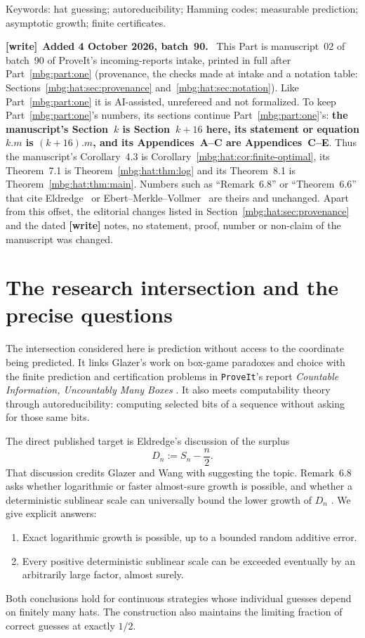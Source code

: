 \documentclass[11pt,letterpaper]{article}
\theoremstyle{definition}
\newcommand{\repo}{\texttt{ProveIt}}
\newenvironment{writenote}[1][]{\par\smallskip\begingroup\small
 \noindent\textbf{[write]}\if\relax\detokenize{#1}\relax\else~\textbf{#1.}\fi\ }%
 {\par\endgroup\smallskip}
\begin{document}
{\small\color{muted}Keywords: hat guessing; autoreducibility; Hamming codes;
measurable prediction; asymptotic growth; finite certificates.\par}

\begin{writenote}[Added 4 October 2026, batch~90]
This Part is manuscript~02 of batch~90 of ProveIt's incoming-reports intake, printed in full after Part~\ref{mbg:part:one} (provenance, the checks made at intake and a notation table: Sections~\ref{mbg:hat:sec:provenance} and~\ref{mbg:hat:sec:notation}). Like Part~\ref{mbg:part:one} it is AI-assisted, unrefereed and not formalized. To keep Part~\ref{mbg:part:one}'s numbers, its sections continue Part~\ref{mbg:part:one}'s: \textbf{the manuscript's Section~$k$ is Section~$k+16$ here, its statement or equation $k.m$ is $(k+16).m$, and its Appendices~A--C are Appendices~C--E}. Thus the manuscript's Corollary~4.3 is Corollary~\ref{mbg:hat:cor:finite-optimal}, its Theorem~7.1 is Theorem~\ref{mbg:hat:thm:log} and its Theorem~8.1 is Theorem~\ref{mbg:hat:thm:main}. Numbers such as ``Remark~6.8'' or ``Theorem~6.6'' that cite Eldredge~\cite{hat:Eldredge} or Ebert--Merkle--Vollmer~\cite{hat:EMV} are theirs and unchanged. Apart from this offset, the editorial changes listed in Section~\ref{mbg:hat:sec:provenance} and the dated \textbf{[write]} notes, no statement, proof, number or non-claim of the manuscript was changed.
\end{writenote}

\section{The research intersection and the precise questions}
\label{mbg:hat:sec:introduction}

The intersection considered here is prediction without access to the
coordinate being predicted. It links Glazer's work on box-game paradoxes
and choice \cite{GlazerBox} with the finite prediction and certification
problems in \repo's report \emph{Countable Information, Uncountably Many
Boxes} \cite{hat:ProveItBoxes}. It also meets computability theory through
autoreducibility: computing selected bits of a sequence without asking
for those same bits.

The direct published target is Eldredge's discussion of the surplus
\[
  D_n:=S_n-\frac n2.
\]
That discussion credits Glazer and Wang with suggesting the topic.
Remark~6.8 asks whether logarithmic or faster almost-sure growth is
possible, and whether a deterministic sublinear scale can universally
bound the lower growth of \(D_n\) \cite{hat:Eldredge}. We give explicit
answers:
\begin{enumerate}
\item Exact logarithmic growth is possible, up to a bounded random
additive error.
\item Every positive deterministic sublinear scale can be exceeded
eventually by an arbitrarily large factor, almost surely.
\end{enumerate}
Both conclusions hold for continuous strategies whose individual
guesses depend on finitely many hats. The construction also maintains
the limiting fraction of correct guesses at exactly \(1/2\).
\end{document}
